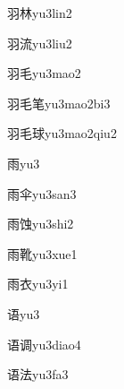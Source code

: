 \begin{verbete}[6;8]{羽林}{yu3lin2}
\end{verbete}

\begin{verbete}[6;10]{羽流}{yu3liu2}
\end{verbete}

\begin{verbete}[6;4]{羽毛}{yu3mao2}
\end{verbete}

\begin{verbete}[6;4;10]{羽毛笔}{yu3mao2bi3}
\end{verbete}

\begin{verbete}[6;4;11]{羽毛球}{yu3mao2qiu2}
\end{verbete}

\begin{verbete}[8]{雨}{yu3}
\end{verbete}

\begin{verbete}[8;6]{雨伞}{yu3san3}
\end{verbete}

\begin{verbete}[8;9]{雨蚀}{yu3shi2}
\end{verbete}

\begin{verbete}[8;13]{雨靴}{yu3xue1}
\end{verbete}

\begin{verbete}[8;6]{雨衣}{yu3yi1}
\end{verbete}

\begin{verbete}[9]{语}{yu3}
\end{verbete}

\begin{verbete}[9;10]{语调}{yu3diao4}
\end{verbete}

\begin{verbete}[9;8]{语法}{yu3fa3}
\end{verbete}

